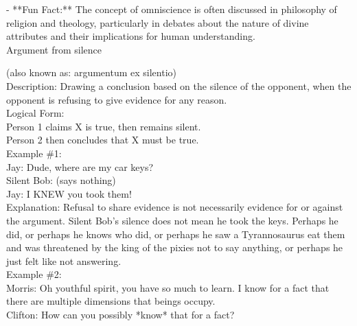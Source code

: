 \documentclass[a4paper,12pt,single,pdftex]{scrbook}
\begin{document}
    
      - **Fun Fact:** The concept of omniscience is often discussed in philosophy of religion and theology, particularly in debates about the nature of divine attributes and their implications for human understanding.
    \\

  

Argument from silence
    
      (also known as: argumentum ex silentio)
    \\

  
    
      Description: Drawing a conclusion based on the silence of the opponent, when the opponent is refusing to give evidence for any reason.
    \\

    
      Logical Form:
    \\

    
      Person 1 claims X is true, then remains silent.
    \\

    
      Person 2 then concludes that X must be true.
    \\

    
      Example \#1:
    \\

    
      Jay: Dude, where are my car keys?
    \\

    
      Silent Bob: (says nothing)
    \\

    
      Jay: I KNEW you took them!
    \\

    
      Explanation: Refusal to share evidence is not necessarily evidence for or against the argument. Silent Bob’s silence does not mean he took the keys.  Perhaps he did, or perhaps he knows who did, or perhaps he saw a Tyrannosaurus eat them and was threatened by the king of the pixies not to say anything, or perhaps he just felt like not answering. 
    \\

    
      Example \#2:
    \\

    
      Morris: Oh youthful spirit, you have so much to learn.  I know for a fact that there are multiple dimensions that beings occupy.
    \\

    
      Clifton: How can you possibly *know* that for a fact?
    \\
\end{document}
